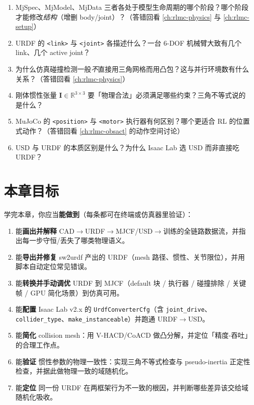\begin{practice}
\begin{enumerate}
  \item MjSpec、MjModel、MjData 三者各处于模型生命周期的哪个阶段？哪个阶段才能修改\emph{结构}（增删 body/joint）？（答错回看 \cref{ch:rlmc-physics} 与 \cref{ch:rlmc-setup}）
  \item URDF 的 \texttt{<link>} 与 \texttt{<joint>} 各描述什么？一台 6-DOF 机械臂大致有几个 link、几个 active joint？
  \item 为什么仿真碰撞检测一般\emph{不}直接用三角网格而用凸包？这与并行环境数有什么关系？（答错回看 \cref{ch:rlmc-physics}）
  \item 刚体惯性张量 $\mathbf{I}\in\mathbb{R}^{3\times3}$ 要「物理合法」必须满足哪些约束？三角不等式说的是什么？
  \item MuJoCo 的 \texttt{<position>} 与 \texttt{<motor>} 执行器有何区别？哪个更适合 RL 的位置式动作？（答错回看 \cref{ch:rlmc-obsact} 的动作空间讨论）
  \item USD 与 URDF 的本质区别是什么？为什么 Isaac Lab 选 USD 而非直接吃 URDF？
\end{enumerate}
\end{practice}

\section*{本章目标}
\label{sec:rlmc-assets-goals}

学完本章，你应当\textbf{能做到}（每条都可在终端或仿真器里验证）：

\begin{enumerate}
  \item 能\textbf{画出并解释} CAD$\to$URDF$\to$MJCF/USD$\to$训练的全链路数据流，并指出每一步守恒/丢失了哪类物理语义。
  \item 能\textbf{导出并修复} sw2urdf 产出的 URDF（mesh 路径、惯性、关节限位），并用脚本自动定位常见错误。
  \item 能\textbf{转换并手动调优} URDF 到 MJCF（default 块 / 执行器 / 碰撞排除 / 关键帧 / GPU 简化场景）到仿真可用。
  \item 能\textbf{配置} Isaac Lab v2.x 的 \texttt{UrdfConverterCfg}（含 \texttt{joint\_drive}、\texttt{collider\_type}、\texttt{make\_instanceable}）并跑通 URDF$\to$USD。
  \item 能\textbf{简化} collision mesh：用 V-HACD/CoACD 做凸分解，并定位「精度-吞吐」的合理工作点。
  \item 能\textbf{验证} 惯性参数的物理一致性：实现三角不等式检查与 pseudo-inertia 正定性检查，并据此做物理一致的域随机化。
  \item 能\textbf{定位} 同一份 URDF 在两框架行为不一致的根因，并判断哪些差异该交给域随机化吸收。
\end{enumerate}

